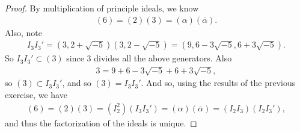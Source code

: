 \documentclass[10pt,oneside,reqno]{amsart}
\theoremstyle{plain}
\theoremstyle{definition}
\begin{document}
\begin{enumerate}
\begin{enumerate}
\begin{proof}
By multiplication of principle ideals, we know
\begin{equation} 
\begin{aligned}
(6) = (2)(3) = (\alpha)(\overline{\alpha}).
\end{aligned}
\end{equation}
Also, note
\begin{equation} 
\begin{aligned}
I_3I_3' = (3,2 + \sqrt{-5})(3, 2 - \sqrt{-5}) = (9, 6 - 3\sqrt{-5}, 6 + 3\sqrt{-5}). 
\end{aligned}
\end{equation}
So $I_3I_3' \subset (3)$ since 3 divides all the above generators. Also
\begin{equation} 
\begin{aligned}
3 = 9 + 6 - 3\sqrt{-5} + 6 + 3\sqrt{-5},
\end{aligned}
\end{equation}
so $(3) \subset I_3I_3'$, and so $(3) = I_3I_3'$. And so, using the results of the previous exercise, we have
\begin{equation} 
\begin{aligned}
(6) = (2)(3) = (I_2^2)(I_3I_3') = (\alpha)(\overline{\alpha}) = (I_2I_3)(I_2I_3'),
\end{aligned}
\end{equation}
and thus the factorization of the ideals is unique. 
\end{proof}


\end{enumerate}

\end{enumerate}
\end{document}
